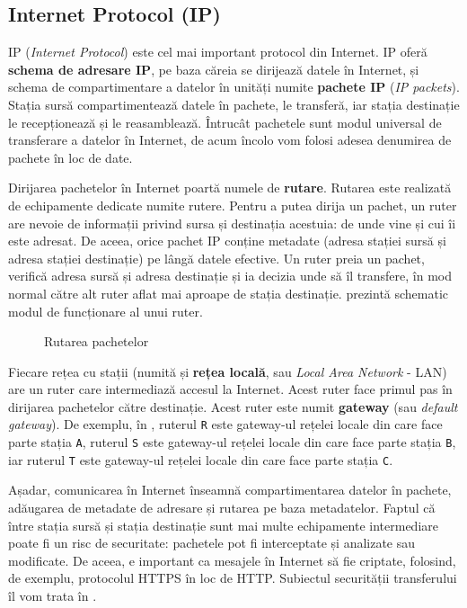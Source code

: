 \subsection{Internet Protocol (IP)}
\label{sec:net:internet:ip}

IP (\textit{Internet Protocol}) este cel mai important protocol din Internet. IP oferă \textbf{schema de adresare IP}, pe baza căreia se dirijează datele în Internet, și schema de compartimentare a datelor în unități numite \textbf{pachete IP} (\textit{IP packets}).
Stația sursă compartimentează datele în pachete, le transferă, iar stația destinație le recepționează și le reasamblează.
Întrucât pachetele sunt modul universal de transferare a datelor în Internet, de acum încolo vom folosi adesea denumirea de pachete în loc de date.

Dirijarea pachetelor în Internet poartă numele de \textbf{rutare}. Rutarea este realizată de echipamente dedicate numite rutere.
Pentru a putea dirija un pachet, un ruter are nevoie de informații privind sursa și destinația acestuia: de unde vine și cui îi este adresat.
De aceea, orice pachet IP conține metadate (adresa stației sursă și adresa stației destinație) pe lângă datele efective.
Un ruter preia un pachet, verifică adresa sursă și adresa destinație și ia decizia unde să îl transfere, în mod normal către alt ruter aflat mai aproape de stația destinație.
 prezintă schematic modul de funcționare al unui ruter.

\begin{figure}[htbp]
  \centering
  \def\svgwidth{\columnwidth}
  
  \caption{Rutarea pachetelor}
  \label{fig:net:routing}
\end{figure}

Fiecare rețea cu stații (numită și \textbf{rețea locală}, sau \textit{Local Area Network} - LAN) are un ruter care intermediază accesul la Internet.
Acest ruter face primul pas în dirijarea pachetelor către destinație.
Acest ruter este numit \textbf{gateway} (sau \textit{default gateway}).
De exemplu, în , ruterul \texttt{R} este gateway-ul rețelei locale din care face parte stația \texttt{A}, ruterul \texttt{S} este gateway-ul rețelei locale din care face parte stația \texttt{B}, iar ruterul \texttt{T} este gateway-ul rețelei locale din care face parte stația \texttt{C}.

Așadar, comunicarea în Internet înseamnă compartimentarea datelor în pachete, adăugarea de metadate de adresare și rutarea pe baza metadatelor.
Faptul că între stația sursă și stația destinație sunt mai multe echipamente intermediare poate fi un risc de securitate: pachetele pot fi interceptate și analizate sau modificate.
De aceea, e important ca mesajele în Internet să fie criptate, folosind, de exemplu, protocolul HTTPS în loc de HTTP.
Subiectul securității transferului îl vom trata în .

